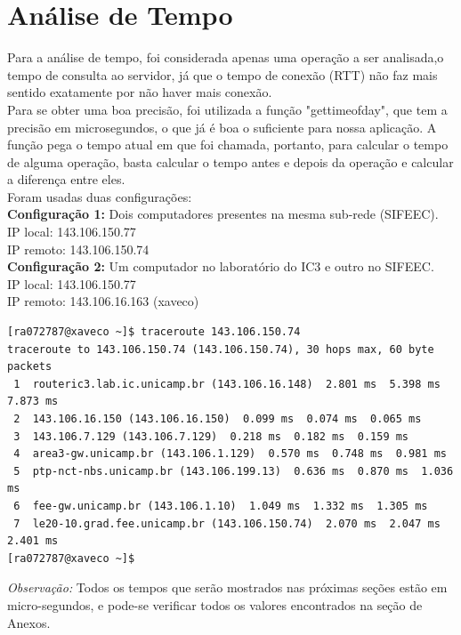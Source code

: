 \documentclass[11pt,twoside]{article}
\begin{document}
\section{Análise de Tempo}
Para a análise de tempo, foi considerada apenas uma operação a ser analisada,o tempo de consulta ao servidor, já que o tempo de conexão (RTT) não faz mais sentido exatamente por não haver mais conexão.\\
Para se obter uma boa precisão, foi utilizada a função "gettimeofday", que tem a precisão em microsegundos, o que já é boa o suficiente para nossa aplicação. A função pega o tempo atual em que foi chamada, portanto, para calcular o tempo de alguma operação, basta calcular o tempo antes e depois da operação e calcular a diferença entre eles.\\
Foram usadas duas configurações:\\
\textbf{Configuração 1: }Dois computadores presentes na mesma sub-rede (SIFEEC).\\
IP local: 143.106.150.77\\
IP remoto: 143.106.150.74\\
\textbf{Configuração 2: }Um computador no laboratório do IC3 e outro no SIFEEC.\\
IP local: 143.106.150.77\\
IP remoto: 143.106.16.163 (xaveco)\\
\begin{verbatim}
[ra072787@xaveco ~]$ traceroute 143.106.150.74
traceroute to 143.106.150.74 (143.106.150.74), 30 hops max, 60 byte packets
 1  routeric3.lab.ic.unicamp.br (143.106.16.148)  2.801 ms  5.398 ms  7.873 ms
 2  143.106.16.150 (143.106.16.150)  0.099 ms  0.074 ms  0.065 ms
 3  143.106.7.129 (143.106.7.129)  0.218 ms  0.182 ms  0.159 ms
 4  area3-gw.unicamp.br (143.106.1.129)  0.570 ms  0.748 ms  0.981 ms
 5  ptp-nct-nbs.unicamp.br (143.106.199.13)  0.636 ms  0.870 ms  1.036 ms
 6  fee-gw.unicamp.br (143.106.1.10)  1.049 ms  1.332 ms  1.305 ms
 7  le20-10.grad.fee.unicamp.br (143.106.150.74)  2.070 ms  2.047 ms  2.401 ms
[ra072787@xaveco ~]$
\end{verbatim}
\textit{Observação: }Todos os tempos que serão mostrados nas próximas seções estão em micro-segundos, e pode-se verificar todos os valores encontrados na seção de Anexos.\\
\end{document}
